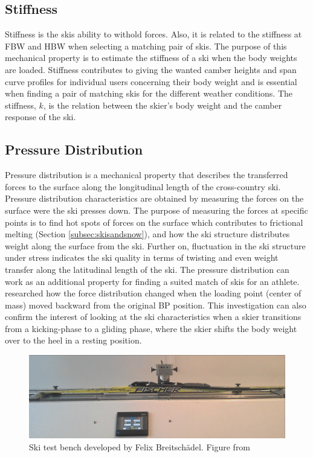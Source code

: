 \subsection{Stiffness}
\label{subsec:stiffness}
Stiffness is the skis ability to withold forces. Also, it is related to the stiffness at FBW and HBW when selecting a matching pair of skis. The purpose of this mechanical property is to estimate the stiffness of a ski when the body weights are loaded. Stiffness contributes to giving the wanted camber heights and span curve profiles for individual users concerning their body weight and is essential when finding a pair of matching skis for the different weather conditions. The stiffness, $k$, is the relation between the skier's body weight and the camber response of the ski.

\subsection{Pressure Distribution}
\label{subsec:pressuredistribution}
Pressure distribution is a mechanical property that describes the transferred forces to the surface along the longitudinal length of the cross-country ski. Pressure distribution characteristics are obtained by measuring the forces on the surface were the ski presses down. The purpose of measuring the forces at specific points is to find hot spots of forces on the surface which contributes to frictional melting (Section \ref{subsec:skisandsnow}), and how the ski structure distributes weight along the surface from the ski. Further on, fluctuation in the ski structure under stress indicates the ski quality in terms of twisting and even weight transfer along the latitudinal length of the ski. The pressure distribution can work as an additional property for finding a suited match of skis for an athlete. \cite{nilsson2013} researched how the force distribution changed when the loading point (center of mass) moved backward from the original BP position. This investigation can also confirm the interest of looking at the ski characteristics when a skier transitions from a kicking-phase to a gliding phase, where the skier shifts the body weight over to the heel in a resting position.

\begin{figure}
    \centering
    \includegraphics[width=1\textwidth]{figures/testbench.png}
    \caption{Ski test bench developed by Felix Breitschädel. Figure from \citep{breitschadel_technical_2014}}
    \label{fig:tbfelix}
\end{figure}


